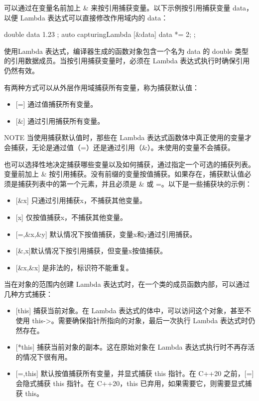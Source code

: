 可以通过在变量名前加上 \& 来按引用捕获变量。以下示例按引用捕获变量 data，以便 Lambda 表达式可以直接修改作用域内的 data：

\begin{cpp}
double data { 1.23 };
auto capturingLambda { [&data]{ data *= 2; } };
\end{cpp}

使用Lambda 表达式，编译器生成的函数对象包含一个名为 data 的 double 类型的引用数据成员。当按引用捕获变量时，必须在 Lambda 表达式执行时确保引用仍然有效。

有两种方式可以从外层作用域捕获所有变量，称为捕获默认值：

\begin{itemize}
\item
{}[=] 通过值捕获所有变量。

\item
{}[\&] 通过引用捕获所有变量。
\end{itemize}

\begin{myNotic}{NOTE}
当使用捕获默认值时，那些在 Lambda 表达式函数体中真正使用的变量才会捕获，无论是通过值（=）还是通过引用（\&）。未使用的变量不会捕获。
\end{myNotic}

也可以选择性地决定捕获哪些变量以及如何捕获，通过指定一个可选的捕获列表。变量前加上 \& 按引用捕获。没有前缀的变量按值捕获。如果存在，捕获默认值必须是捕获列表中的第一个元素，并且必须是 \& 或 =。以下是一些捕获块的示例：

\begin{itemize}
\item
{}[\&x] 只通过引用捕获x，不捕获其他变量。

\item
{}[x] 仅按值捕获x，不捕获其他变量。

\item
{}[=,\&x,\&y] 默认情况下按值捕获，变量x和y通过引用捕获。

\item
{}[\&,x]默认情况下按引用捕获，但变量x按值捕获。

\item
{}[\&x,\&x] 是非法的，标识符不能重复。
\end{itemize}

当在对象的范围内创建 Lambda 表达式时，在一个类的成员函数内部，可以通过几种方式捕获：

\begin{itemize}
\item
{}[this] 捕获当前对象。在 Lambda 表达式的体中，可以访问这个对象，甚至不使用 this->。需要确保指针所指向的对象，最后一次执行 Lambda 表达式时仍然存在。

\item
{}[*this] 捕获当前对象的副本。这在原始对象在 Lambda 表达式执行时不再存活的情况下很有用。

\item
{}[=,this] 默认按值捕获所有变量，并显式捕获 this 指针。在 C++20 之前，[=] 会隐式捕获 this 指针。在 C++20，this 已弃用，如果需要它，则需要显式捕获 this。
\end{itemize}

